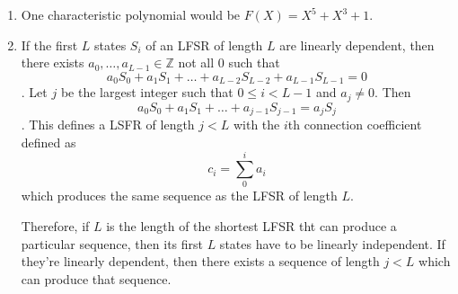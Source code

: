 \begin{enumerate}
\item One characteristic polynomial would be $F(X) = X^5 + X^3 + 1$.

\item If the first $L$ states $S_i$ of an LFSR of length $L$ are linearly
dependent, then there exists $a_0, \dots, a_{L-1} \in \mathbb{Z}$ not all $0$
such that \[a_0 S_0 + a_1 S_1 + \dots + a_{L-2} S_{L-2} + a_{L-1} S_{L-1} = 0\].
Let $j$ be the largest integer such that $0 \leq i < L-1$ and $a_j \neq 0$. Then
\[a_0 S_0 + a_1 S_1 + \dots + a_{j-1} S_{j-1} = a_j S_j\].  This defines a LSFR
of length $j < L$ with the $i$th connection coefficient defined as \[c_i =
\sum_0^i a_i\] which produces the same sequence as the LFSR of length $L$. 

Therefore, if $L$ is the length of the shortest LFSR tht can produce a
particular sequence, then its first $L$ states have to be linearly independent.
If they're linearly dependent, then there exists a sequence of length $j < L$
which can produce that sequence. 

\end{enumerate}
